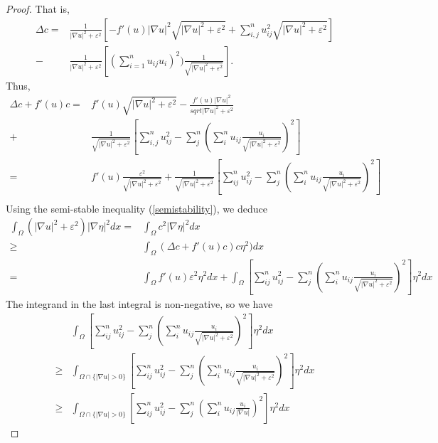 \documentclass[paper=a4, fontsize=11pt]{scrartcl} %
\numberwithin{equation}{section} %
\numberwithin{figure}{section} %
\numberwithin{table}{section} %
\numberwithin{exercise}{section}
\begin{document}
\begin{itemize}
\begin{proof}
That is,
\begin{align*}
\Delta c=&\frac{1}{|\nabla u|^2 +\varepsilon^2} \left[-f'(u)|\nabla u|^2 \sqrt{|\nabla u|^2 +\varepsilon^2}+\sum_{i,j}^n u_{ij}^2\sqrt{|\nabla u|^2 +\varepsilon^2} \right]\\
{}-&\frac{1}{|\nabla u|^2 +\varepsilon^2} \left[ (\sum_{i=1}^n u_{ij} u_i)^2 )\frac{1}{\sqrt{|\nabla u|^2 +\varepsilon^2}} \right].
\end{align*}
Thus, 
\begin{align*}
\Delta c+f'(u) c=& f'(u) \sqrt{|\nabla u|^2 +\varepsilon^2}-\frac{f'(u)|\nabla u|^2}{sqrt{|\nabla u|^2 +\varepsilon^2}} \\
{}+& \frac{1}{\sqrt{|\nabla u|^2 +\varepsilon^2}}\left[\sum_{i,j}^n u_{ij}^2-\sum_{j}^n\left(\sum_{i}^n u_{ij} \frac{u_i}{\sqrt{|\nabla u|^2 +\varepsilon^2}}\right)^2 \right]\\
{}=& f'(u)\frac{\varepsilon^2}{\sqrt{|\nabla u|^2 +\varepsilon^2}}+\frac{1}{\sqrt{|\nabla u|^2 +\varepsilon^2}} \left[\sum_{ij} ^nu_{ij}^2-\sum_{j}^n\left(\sum_{i}^nu_{ij} \frac{u_i}{\sqrt{|\nabla u|^2 +\varepsilon^2}} \right)^2 \right]\\
\end{align*}
Using the semi-stable inequality (\ref{semistability}), we deduce 
\begin{align*}
\int_{\Omega}(|\nabla u|^2 +\varepsilon^2)|\nabla \eta|^2dx =& \int_{\Omega} c^2 |\nabla \eta|^2 dx\\
{}\geq & \int_{\Omega} (\Delta c+f'(u) c) c\eta^2) dx\\
{}=&\int_{\Omega}f'(u)\varepsilon^2 \eta^2 dx+\int_{\Omega}\left[\sum_{ij}^n u_{ij}^2-\sum_{j}^n\left(\sum_{i}^nu_{ij} \frac{u_i}{\sqrt{|\nabla u|^2 +\varepsilon^2}} \right)^2\right]\eta^2 dx 
\end{align*}
The integrand in the last integral is non-negative, so we have 
\begin{align*}
&\int_{\Omega}\left[\sum_{ij}^n u_{ij}^2-\sum_{j}^n\left(\sum_{i}^nu_{ij} \frac{u_i}{\sqrt{|\nabla u|^2 +\varepsilon^2}} \right)^2\right]\eta^2 dx  \\
\geq &\int_{\Omega\cap \{|\nabla u|>0\}}\left[\sum_{ij}^n u_{ij}^2-\sum_{j}^n\left(\sum_{i}^nu_{ij} \frac{u_i}{\sqrt{|\nabla u|^2 +\varepsilon^2}} \right)^2\right]\eta^2 dx \\
\geq &\int_{\Omega\cap \{|\nabla u|>0\}}\left[\sum_{ij}^n u_{ij}^2-\sum_{j}^n\left(\sum_{i}^nu_{ij} \frac{u_i}{|\nabla u|} \right)^2\right]\eta^2 dx 
\end{align*}


\end{proof}
\end{itemize}
\end{document}
